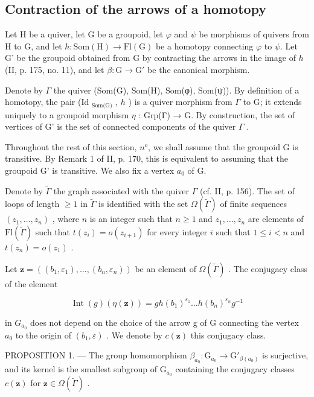 \subsection{Contraction of the arrows of a homotopy}

Let H be a quiver, let G be a groupoid, let \(\varphi\) and \(\psi\) be morphisms of quivers from H to G, and let \(h\colon \mathrm{Som}(\mathrm{H})\to \mathrm{Fl}(\mathrm{G})\) be a homotopy connecting \(\varphi\) to \(\psi\). Let G' be the groupoid obtained from G by contracting the arrows in the image of \(h\) (II, p. 175, no. 11), and let \(\beta\colon\mathrm{G}\to\mathrm{G}'\) be the canonical morphism.

Denote by \(\Gamma\) the quiver (Som(G), Som(H), Som(φ), Som(ψ)). By definition of a homotopy, the pair (Id \(_{\text{Som(G)}}\) , \(h\) ) is a quiver morphism from \(\Gamma\) to G; it extends uniquely to a groupoid morphism \(\eta\) : Grp(Γ) → G. By construction, the set of vertices of G' is the set of connected components of the quiver \(\Gamma\) .

Throughout the rest of this section, \(n^{o}\), we shall assume that the groupoid G is transitive. By Remark 1 of II, p. 170, this is equivalent to assuming that the groupoid G' is transitive. We also fix a vertex \(a_{0}\) of G.

Denote by \(\widetilde{\Gamma}\) the graph associated with the quiver \(\Gamma\) (cf. II, p. 156). The set of loops of length \(\geqslant 1\) in \(\widetilde{\Gamma}\) is identified with the set \(\Omega(\widetilde{\Gamma})\) of finite sequences \((z_1, \ldots, z_n)\) , where \(n\) is an integer such that \(n \geqslant 1\) and \(z_1, \ldots, z_n\) are elements of \(\mathrm{Fl}(\widetilde{\Gamma})\) such that \(t(z_i) = o(z_{i+1})\) for every integer \(i\) such that \(1 \leqslant i < n\) and \(t(z_n) = o(z_1)\) .

Let \(\mathbf{z} = ((b_{1}, \varepsilon_{1}), \ldots, (b_{n}, \varepsilon_{n}))\) be an element of \(\Omega(\widetilde{\Gamma})\) . The conjugacy class of the element

\[
\operatorname{Int} (g) (\eta (\mathbf {z})) = g h (b _ {1}) ^ {\varepsilon_ {1}} \dots h (b _ {n}) ^ {\varepsilon_ {n}} g ^ {- 1}
\]

in \(G_{a_{0}}\) does not depend on the choice of the arrow g of G connecting the vertex \(a_{0}\) to the origin of \((b_{1},\varepsilon)\) . We denote by \(c(\mathbf{z})\) this conjugacy class.

PROPOSITION 1. --- The group homomorphism \(\beta_{a_0} \colon \mathrm{G}_{a_0} \to \mathrm{G}'_{\beta(a_0)}\) is surjective, and its kernel is the smallest subgroup of \(\mathrm{G}_{a_0}\) containing the conjugacy classes \(c(\mathbf{z})\) for \(\mathbf{z} \in \Omega(\widetilde{\Gamma})\) .

